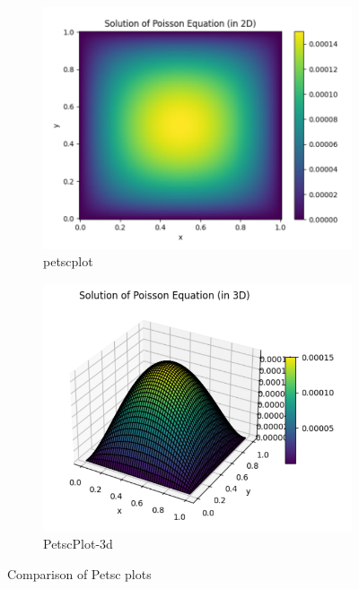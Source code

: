 \documentclass[unicode,11pt,a4paper,oneside,numbers=endperiod,openany]{scrartcl}
\begin{document}
\begin{figure}[htbp]
    \centering
  
    \begin{subfigure}[b]{0.5\textwidth}
        \includegraphics[width=\textwidth]{images/petscplot.png} 
        \caption{petscplot}
        \label{fig:petscplot}
    \end{subfigure}
    \hfill

    \begin{subfigure}[b]{0.5\textwidth}
        \includegraphics[width=\textwidth]{images/PetscPlot-3d.png} 
        \caption{PetscPlot-3d}
        \label{fig:petscplot-3d}
    \end{subfigure}
    \caption{Comparison of Petsc plots}
    \label{fig:comparison}
\end{figure}
\end{document}
